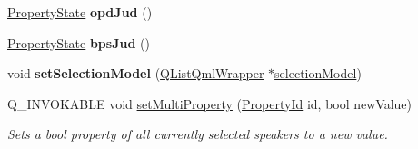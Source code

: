 \begin{DoxyCompactItemize}
\item 
\hypertarget{classMixedValueSpeakerModel_a61d941fb2ae0971bd12103fae043c2ed}{\hyperlink{classMixedValueSpeakerModel_ab53ddbef6944a7444b39801fb4cf07f1}{Property\-State} {\bfseries opd\-Jud} ()}\label{classMixedValueSpeakerModel_a61d941fb2ae0971bd12103fae043c2ed}

\item 
\hypertarget{classMixedValueSpeakerModel_a5e4498aff43997d219ede6199cbedfcf}{\hyperlink{classMixedValueSpeakerModel_ab53ddbef6944a7444b39801fb4cf07f1}{Property\-State} {\bfseries bps\-Jud} ()}\label{classMixedValueSpeakerModel_a5e4498aff43997d219ede6199cbedfcf}

\item 
\hypertarget{classMixedValueSpeakerModel_a8a95e8da0d76aba08463d127c0a758fb}{void {\bfseries set\-Selection\-Model} (\hyperlink{classQListQmlWrapper}{Q\-List\-Qml\-Wrapper} $\ast$\hyperlink{classMixedValueSpeakerModel_a58e2d9f253efcec1338b063636f671c7}{selection\-Model})}\label{classMixedValueSpeakerModel_a8a95e8da0d76aba08463d127c0a758fb}

\item 
Q\-\_\-\-I\-N\-V\-O\-K\-A\-B\-L\-E void \hyperlink{classMixedValueSpeakerModel_a75dca37807957d62e0327ff183abcd31}{set\-Multi\-Property} (\hyperlink{classMixedValueSpeakerModel_a37c5eeb40e2cbb783e862bd46248581e}{Property\-Id} id, bool new\-Value)
\begin{DoxyCompactList}\small\item\em Sets a bool property of all currently selected speakers to a new value. \end{DoxyCompactList}\end{DoxyCompactItemize}
